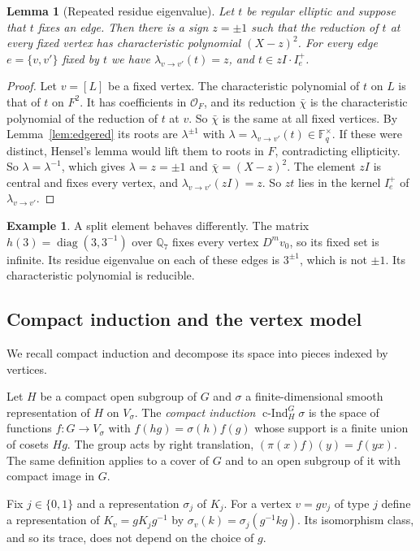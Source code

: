 \documentclass[12pt,letterpaper]{article}
\numberwithin{equation}{section}
\newtheorem{lemma}[theorem]{Lemma}
\theoremstyle{definition}
\newtheorem{example}[theorem]{Example}
\theoremstyle{remark}
\newcommand{\OO}{\mathcal O_F}
\newcommand{\kk}{\mathbb F_q}
\newcommand{\cInd}{\operatorname{c-Ind}}
\newcommand{\diag}{\operatorname{diag}}
\begin{document}
\begin{lemma}[Repeated residue eigenvalue]\label{lem:repeated}
Let $t$ be regular elliptic and suppose that $t$ fixes an edge. Then there is a sign $z=\pm1$ such that the reduction of $t$ at every fixed vertex has characteristic polynomial $(X-z)^2$. For every edge $e=\{v,v'\}$ fixed by $t$ we have $\lambda_{v\to v'}(t)=z$, and $t\in zI\cdot I_e^+$.
\end{lemma}
\begin{proof}
Let $v=[L]$ be a fixed vertex. The characteristic polynomial of $t$ on $L$ is that of $t$ on $F^2$. It has coefficients in $\OO$, and its reduction $\bar\chi$ is the characteristic polynomial of the reduction of $t$ at $v$. So $\bar\chi$ is the same at all fixed vertices. By Lemma~\ref{lem:edgered} its roots are $\lambda^{\pm1}$ with $\lambda=\lambda_{v\to v'}(t)\in\kk^\times$. If these were distinct, Hensel's lemma would lift them to roots in $F$, contradicting ellipticity. So $\lambda=\lambda^{-1}$, which gives $\lambda=z=\pm1$ and $\bar\chi=(X-z)^2$. The element $zI$ is central and fixes every vertex, and $\lambda_{v\to v'}(zI)=z$. So $zt$ lies in the kernel $I_e^+$ of $\lambda_{v\to v'}$.
\end{proof}

\begin{example}
A split element behaves differently. The matrix $h(3)=\diag(3,3^{-1})$ over $\mathbb Q_7$ fixes every vertex $D^mv_0$, so its fixed set is infinite. Its residue eigenvalue on each of these edges is $3^{\pm1}$, which is not $\pm1$. Its characteristic polynomial is reducible.
\end{example}

\subsection*{Compact induction and the vertex model}
We recall compact induction and decompose its space into pieces indexed by vertices.

Let $H$ be a compact open subgroup of $G$ and $\sigma$ a finite-dimensional smooth representation of $H$ on $V_\sigma$. The \emph{compact induction} $\cInd_H^G\sigma$ is the space of functions $f:G\to V_\sigma$ with $f(hg)=\sigma(h)f(g)$ whose support is a finite union of cosets $Hg$. The group acts by right translation, $(\pi(x)f)(y)=f(yx)$. The same definition applies to a cover of $G$ and to an open subgroup of it with compact image in $G$.

Fix $j\in\{0,1\}$ and a representation $\sigma_j$ of $K_j$. For a vertex $v=gv_j$ of type $j$ define a representation of $K_v=gK_jg^{-1}$ by $\sigma_v(k)=\sigma_j(g^{-1}kg)$. Its isomorphism class, and so its trace, does not depend on the choice of $g$.
\end{document}
